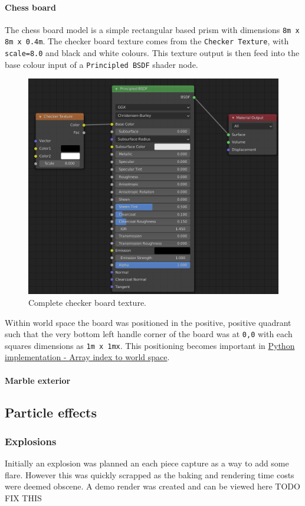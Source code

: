 \documentclass[11pt]{article}
\begin{document}
\paragraph{Chess board}
\label{sec:org65b8c07}
The chess board model is a simple rectangular based prism with dimensions \texttt{8m x
8m x 0.4m}. The checker board texture comes from the \texttt{Checker Texture}, with
\texttt{scale=8.0} and black and white colours. This texture output is then feed into
the base colour input of a \texttt{Principled BSDF} shader node.

\begin{figure}[htbp]
\centering
\includegraphics[width=350pt]{Images/checker texture.png}
\caption{\label{checker-texture}Complete checker board texture.}
\end{figure}

Within world space the board was positioned in the positive, positive quadrant
such that the very bottom left handle corner of the board was at \texttt{0,0}
with each squares dimensions as \texttt{1m x 1mx}. This positioning becomes important
in \hyperref[sec:orgecee11b]{Python implementation - Array index to world space}.
\paragraph{Marble exterior}
\label{sec:orgdbed3f2}
\subsection{Particle effects}
\label{sec:orgace6ae5}
\subsubsection{Explosions}
\label{sec:orga981034}
Initially an explosion was planned an each piece capture as a way to add some
flare. However this was quickly scrapped as the baking and rendering time costs
were deemed obscene. A demo render was created and can be viewed here TODO FIX
THIS
\end{document}
